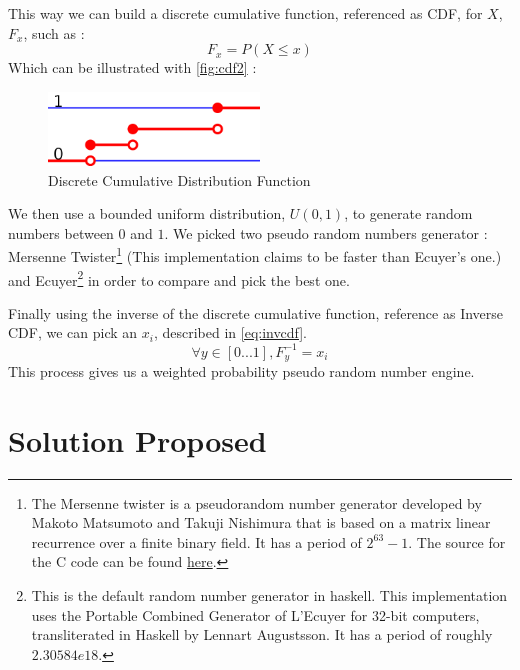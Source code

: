 \documentclass[12pt,a4paper,article]{memoir} %
\begin{document}
This way we can build a discrete cumulative function, referenced as CDF,
 for $X$, $F_x$, such as :
\begin{equation}
	F_x = P\left( X \leq x \right)
	\label{eq:cdf}
\end{equation}
Which can be illustrated with \autoref{fig:cdf2} :
\begin{figure}[h!]
\begin{center}
\includegraphics[width=0.5\textwidth]{img/cdf.png}
\caption{Discrete Cumulative Distribution Function}
\label{fig:cdf2}
\end{center}
\end{figure}

We then use a bounded uniform distribution, $U\left(0,1\right)$,
to generate random numbers between $0$ and $1$.
We picked two pseudo random numbers generator : Mersenne Twister\footnote{
The Mersenne twister is a pseudorandom number generator developed by 
Makoto Matsumoto and Takuji Nishimura that is based on a matrix linear 
recurrence over a finite binary field. 
It has a period of $2^{63}-1$.
The source for the C code can be found 
\href{http://www.math.sci.hiroshima-u.ac.jp/~m-mat/MT/emt64.html}{here}.
} (This implementation claims to be faster than Ecuyer's one.) and Ecuyer\footnote{
This is the default random number generator in haskell.
 This implementation uses the Portable Combined Generator of L'Ecuyer
 for 32-bit computers, transliterated in Haskell by Lennart Augustsson. 
 It has a period of roughly $2.30584e18$.
 } in order to compare and pick the best one.

Finally using the inverse of the discrete cumulative function, reference as Inverse CDF, 
we can pick an $x_i$, described in \autoref{eq:invcdf}.
\begin{equation}
	\forall y \in \left[0...1 \right], F^{-1}_y = x_i
	\label{eq:invcdf}
\end{equation}
This process gives us a weighted probability pseudo random number engine.

\section{Solution Proposed}
\end{document}
